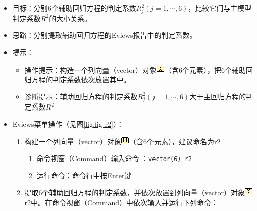 \documentclass[12pt,(landscape,a4paper),(portrait,a4paper)]{article}
\providecommand{\tightlist}{%
  \setlength{\itemsep}{0pt}\setlength{\parskip}{0pt}}
\begin{document}
\begin{itemize}
\tightlist
\item
  目标：分别6个辅助回归方程的判定系数\(R^2_j(j=1,\cdots,6)\)，比较它们与主模型判定系数\(R^2\)的大小关系。\\
\item
  思路：分别提取辅助回归方程的Eviews报告中的判定系数。\\
\item
  提示：

  \begin{itemize}
  \tightlist
  \item
    操作提示：构造一个列向量（vector）对象\includegraphics{picture/object/Vector.png}（含6个元素），把6个辅助回归方程的判定系数依次放置其中。
  \item
    诊断提示：辅助回归方程的判定系数\(R^2_j(j=1,\cdots,6)\)大于主回归方程的判定系数\(R^2\)\\
  \end{itemize}
\item
  Eviews菜单操作（见图\ref{fig:fig-r2}）：

  \begin{enumerate}
  \def\labelenumi{\arabic{enumi})}
  \tightlist
  \item
    构建一个列向量（vector）对象\includegraphics{picture/object/Vector.png}（含6个元素），建议命名为r2

    \begin{enumerate}
    \def\labelenumii{\alph{enumii}.}
    \tightlist
    \item
      命令视窗（Command）输入命令 ：\texttt{vector(6)\ r2}
    \item
      运行命令：命令行中按Enter键
    \end{enumerate}
  \item
    提取6个辅助回归方程的判定系数，并依次放置到列向量（vector）对象\includegraphics{picture/object/Vector.png}r2中。在命令视窗（Command）中依次输入并运行下列命令：


\end{enumerate}
\end{itemize}
\end{document}
